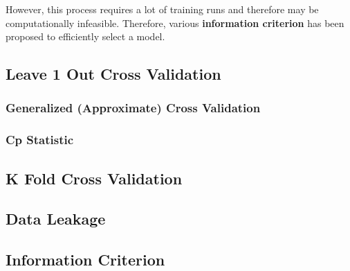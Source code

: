 \documentclass{article}
\begin{document}
    However, this process requires a lot of training runs and therefore may be computationally infeasible. Therefore, various \textbf{information criterion} has been proposed to efficiently select a model. 

  \subsection{Leave 1 Out Cross Validation} 

    \subsubsection{Generalized (Approximate) Cross Validation} 

    \subsubsection{Cp Statistic}

  \subsection{K Fold Cross Validation}

  \subsection{Data Leakage}

  \subsection{Information Criterion}





\end{document}
